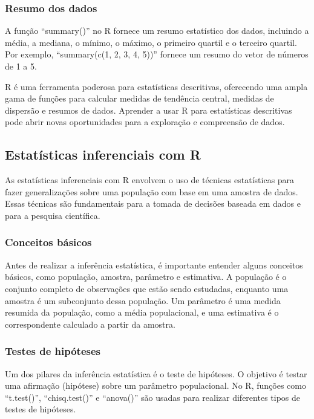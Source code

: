 \documentclass[
]{book}
\begin{document}
\subsubsection{Resumo dos dados}\label{resumo-dos-dados}

A função ``summary()'' no R fornece um resumo estatístico dos dados, incluindo a média, a mediana, o mínimo, o máximo, o primeiro quartil e o terceiro quartil. Por exemplo, ``summary(c(1, 2, 3, 4, 5))'' fornece um resumo do vetor de números de 1 a 5.

R é uma ferramenta poderosa para estatísticas descritivas, oferecendo uma ampla gama de funções para calcular medidas de tendência central, medidas de dispersão e resumos de dados. Aprender a usar R para estatísticas descritivas pode abrir novas oportunidades para a exploração e compreensão de dados.

\subsection{Estatísticas inferenciais com R}\label{estatuxedsticas-inferenciais-com-r}

As estatísticas inferenciais com R envolvem o uso de técnicas estatísticas para fazer generalizações sobre uma população com base em uma amostra de dados. Essas técnicas são fundamentais para a tomada de decisões baseada em dados e para a pesquisa científica.

\subsubsection{Conceitos básicos}\label{conceitos-buxe1sicos}

Antes de realizar a inferência estatística, é importante entender alguns conceitos básicos, como população, amostra, parâmetro e estimativa. A população é o conjunto completo de observações que estão sendo estudadas, enquanto uma amostra é um subconjunto dessa população. Um parâmetro é uma medida resumida da população, como a média populacional, e uma estimativa é o correspondente calculado a partir da amostra.

\subsubsection{Testes de hipóteses}\label{testes-de-hipuxf3teses-1}

Um dos pilares da inferência estatística é o teste de hipóteses. O objetivo é testar uma afirmação (hipótese) sobre um parâmetro populacional. No R, funções como ``t.test()'', ``chisq.test()'' e ``anova()'' são usadas para realizar diferentes tipos de testes de hipóteses.
\end{document}
